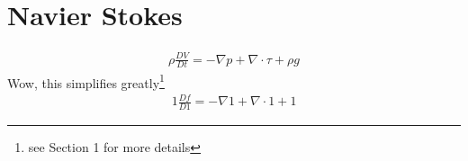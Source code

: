\setcounter{section}{0}

\section{Navier Stokes}
\begin{align*}
  \rho \frac{D V}{D t}
  =-\nabla p + \nabla\cdot \tau+\rho g
\end{align*}
Wow, this simplifies greatly\footnote{see Section 1 for more details}
\begin{align*}
  1 \frac{D f}{D 1}
  =-\nabla 1 + \nabla\cdot 1+1
\end{align*}

